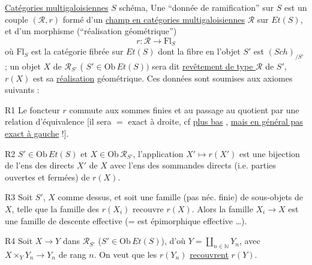 \uline{Catégories multigaloisiennes}
$S$ schéma, 
Une ``donnée de ramification'' sur $S$ est un couple $(\mathscr R,r)$ formé d'un \uline{champ en catégories multigaloisiennes} $\mathscr R$ sur $Et(S)$,
et d'un morphisme   (``réalisation géométrique'')
\[
r:\mathscr R\longrightarrow \mathrm{Fl}_S
\]
où $\mathrm{Fl}_S$ est la  catégorie fibrée sur $Et(S)$ dont la fibre en l'objet $S'$ est $(Sch)_{/S'}$ ;
 un objet $X$ de $\mathscr R_{S'}$ (  $S'\in\mathrm{Ob}\,Et(S))$ sera dit \uline{revêtement de type $\mathscr R$} de $S'$,  $r(X)$ est sa \uline{réalisation} géométrique.
 Ces données sont soumises aux axiomes suivants :

R1 Le foncteur $r$ commute aux sommes finies et au passage au quotient
par une relation d'équivalence
[il sera $=$ exact à droite, cf \uline{plus bas} \unsure{\ldots}, \uline{mais en général pas exact à gauche} !].

R2  $S'\in\mathrm{Ob}\,Et(S)$ et $X\in\mathrm{Ob}\,\mathscr R_{S'}$, l'application $X'\mapsto r(X')$ est une bijection de l'ens des  directs  $X'$ de $X$ avec l'ens des sommandes directs (i.e. parties ouvertes et fermées) de $r(X)$.

R3 Soit $S'$, $X$ comme dessus, et soit  une famille (pas néc. finie) de  sous-objets de $X$, telle que la famille des $r(X_i)$ recouvre $r(X)$. Alors la  famille $X_i\longrightarrow X$ est une famille de descente effective (= est épimorphique effective \ldots).

R4 Soit $X\to Y$ dans $\mathscr R_{S'}$ ($S'\in\mathrm{Ob}\,Et(S)$), d'où $Y=\coprod_{n\in\mathbb N}Y_n$, avec $X\times_Y Y_n\to Y_n$ de rang $n$. On veut que les $r(Y_n)$ \uline{recouvrent} $r(Y)$.

